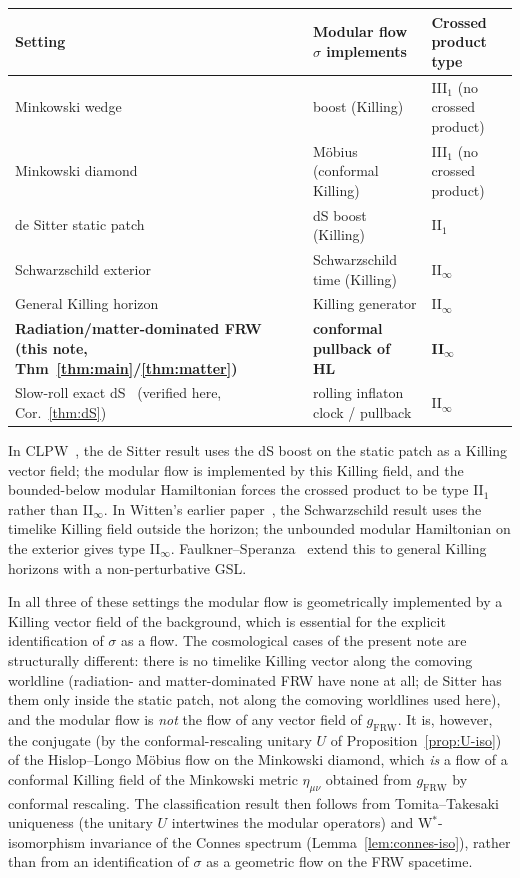 \documentclass[11pt]{article}
\theoremstyle{definition}
\newcommand{\FRW}{\mathrm{FRW}}
\begin{document}
\begin{center}
\renewcommand{\arraystretch}{1.2}
\begin{tabular}{lll}
\hline
Setting & Modular flow $\sigma$ implements & Crossed product type \\
\hline
Minkowski wedge~\cite{BisognanoWichmann1975,BisognanoWichmann1976} & boost (Killing) & III$_1$ (no crossed product) \\
Minkowski diamond~\cite{HislopLongo1982} & M\"obius (conformal Killing) & III$_1$ (no crossed product) \\
de Sitter static patch~\cite{CLPW2023} & dS boost (Killing) & II$_1$ \\
Schwarzschild exterior~\cite{Witten2022} & Schwarzschild time (Killing) & II$_\infty$ \\
General Killing horizon~\cite{FaulknerSperanza2024} & Killing generator & II$_\infty$ \\
\textbf{Radiation/matter-dominated FRW (this note, Thm~\ref{thm:main}/\ref{thm:matter})} & \textbf{conformal pullback of HL} & \textbf{II$_\infty$} \\
Slow-roll exact dS~\cite{ChenPenington2024} (verified here, Cor.~\ref{thm:dS}) & rolling inflaton clock / pullback & II$_\infty$ \\
\hline
\end{tabular}
\end{center}

\medskip

In CLPW~\cite{CLPW2023}, the de Sitter result uses the dS boost on the static patch as a Killing vector field; the modular flow is implemented by this Killing field, and the bounded-below modular Hamiltonian forces the crossed product to be type II$_1$ rather than II$_\infty$. In Witten's earlier paper~\cite{Witten2022}, the Schwarzschild result uses the timelike Killing field outside the horizon; the unbounded modular Hamiltonian on the exterior gives type II$_\infty$. Faulkner--Speranza~\cite{FaulknerSperanza2024} extend this to general Killing horizons with a non-perturbative GSL.

In all three of these settings the modular flow is geometrically implemented by a Killing vector field of the background, which is essential for the explicit identification of $\sigma$ as a flow. The cosmological cases of the present note are structurally different: there is no timelike Killing vector along the comoving worldline (radiation- and matter-dominated FRW have none at all; de Sitter has them only inside the static patch, not along the comoving worldlines used here), and the modular flow is \emph{not} the flow of any vector field of $g_\FRW$. It is, however, the conjugate (by the conformal-rescaling unitary $U$ of Proposition~\ref{prop:U-iso}) of the Hislop--Longo M\"obius flow on the Minkowski diamond, which \emph{is} a flow of a conformal Killing field of the Minkowski metric $\eta_{\mu\nu}$ obtained from $g_\FRW$ by conformal rescaling. The classification result then follows from Tomita--Takesaki uniqueness (the unitary $U$ intertwines the modular operators) and W$^*$-isomorphism invariance of the Connes spectrum (Lemma~\ref{lem:connes-iso}), rather than from an identification of $\sigma$ as a geometric flow on the FRW spacetime.
\end{document}
